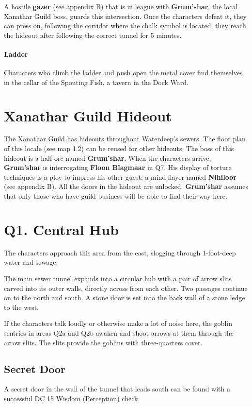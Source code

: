 \documentclass[10pt,a4paper,twoside,twocolumn,openany,nodeprecatedcode]{dndbook}
\begin{document}
A hostile \textbf{gazer} (see appendix B) that is in league with \textbf{Grum'shar}, the local Xanathar Guild boss, guards this intersection. Once the characters defeat it, they can press on, following the corridor where the chalk symbol is located; they reach the hideout after following the correct tunnel for 5 minutes.
\paragraph{Ladder}
Characters who climb the ladder and push open the metal cover find themselves in the cellar of the Spouting Fish, a tavern in the Dock Ward.
\section{Xanathar Guild Hideout}
The Xanathar Guild has hideouts throughout Waterdeep's sewers. The floor plan of this locale (see map 1.2) can be reused for other hideouts.
The boss of this hideout is a half-orc named \textbf{Grum'shar}. When the characters arrive, \textbf{Grum'shar} is interrogating \textbf{Floon Blagmaar} in Q7. His display of torture techniques is a ploy to impress his other guest: a mind flayer named \textbf{Nihiloor} (see appendix B).
All the doors in the hideout are unlocked. \textbf{Grum'shar} assumes that only those who have guild business will be able to find their way here.
\section{Q1. Central Hub}
The characters approach this area from the east, slogging through 1-foot-deep water and sewage.
\begin{DndReadAloud}{}
The main sewer tunnel expands into a circular hub with a pair of arrow slits carved into its outer walls, directly across from each other. Two passages continue on to the north and south. A stone door is set into the back wall of a stone ledge to the west.
\end{DndReadAloud}

If the characters talk loudly or otherwise make a lot of noise here, the goblin sentries in areas Q2a and Q2b awaken and shoot arrows at them through the arrow slits. The slits provide the goblins with three-quarters cover.
\subsection{Secret Door}
A secret door in the wall of the tunnel that leads south can be found with a successful DC 15 Wisdom (Perception) check.
\end{document}

